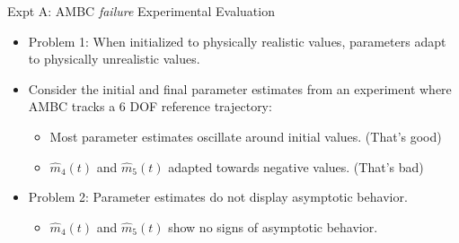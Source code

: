 \begin{frame}{Expt A: AMBC {\it failure }Experimental Evaluation}

\begin{itemize}
\item<1->\alert<1-4>{Problem 1:} %
 When initialized to
  physically realistic values, parameters adapt to physically
  unrealistic values.
\item<2-4>Consider the initial and final parameter estimates from an
  experiment where AMBC tracks a 6 DOF reference trajectory:
\begin{itemize}
\item<3-4> Most parameter estimates oscillate around initial values. (That's good)
\item<4>$\hat{m}_4(t)$ and $\hat{m}_5(t)$ adapted towards negative values.  (That's bad)
\end{itemize}
\item<5->\alert<5->{Problem 2:} %
Parameter estimates do
  not display asymptotic behavior.
\begin{itemize}
\item<6->$\hat{m}_4(t)$ and $\hat{m}_5(t)$ show no signs of asymptotic
  behavior.
\end{itemize}
\end{itemize}


\end{frame}
